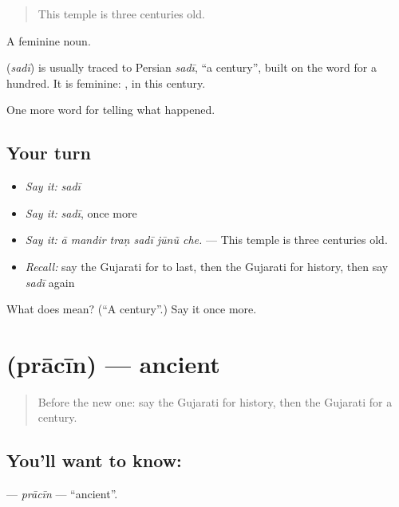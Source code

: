 \begin{quote}
This temple is three centuries old.
\end{quote}

A feminine noun.

\begin{cousinweb}
\textbf{} (\emph{sadī}) is usually traced to Persian \emph{sadī}, \textquotedblleft{}a century\textquotedblright{}, built on the word for a hundred. It is feminine: \textbf{ }, in this century.
\end{cousinweb}

\begin{grammarlens}[title={What you've built}]
One more word for telling what happened.
\end{grammarlens}

\subsection*{Your turn}
\begin{itemize}
\raggedright
  \item \emph{Say it:} \emph{sadī}
  \item \emph{Say it:} \emph{sadī}, once more
  \item \emph{Say it:} \emph{ā mandir traṇ sadī jūnũ che.} — This temple is three centuries old.
  \item \emph{Recall:} say the Gujarati for to last, then the Gujarati for history, then say \emph{sadī} again
\end{itemize}

\begin{tcolorbox}[breakable,colback=teal!4,colframe=teal!35!black,title={Before you move on}]
What does  mean? (\textquotedblleft{}A century\textquotedblright{}.) Say it once more.
\end{tcolorbox}
\section[\texorpdfstring{\gu{પ્રાચીન} (prācīn)}{પ્રાચીન (prācīn)}]{ (prācīn) — ancient}

\label{lesson:GU-C317-pracin}



\begin{quote}
Before the new one: say the Gujarati for history, then the Gujarati for a century.
\end{quote}

\subsection*{You'll want to know: }
\textbf{} — \emph{prācīn} — \textquotedblleft{}ancient\textquotedblright{}.

